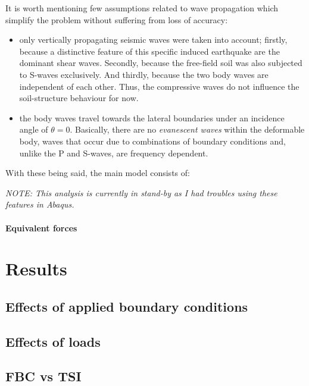 	It is worth mentioning few assumptions related to wave propagation which simplify the problem without suffering from loss of accuracy:
	\begin{itemize}
		\item only vertically propagating seismic waves were taken into account; firstly, because a distinctive feature of this specific induced earthquake are the dominant shear waves. Secondly, because the free-field soil was also subjected to S-waves exclusively. And thirdly, because the two body waves are independent of each other. Thus, the compressive waves do not influence the soil-structure behaviour for now.
		\item the body waves travel towards the lateral boundaries under an incidence angle of $\theta = 0$. Basically, there are no \textit{evanescent waves} within the deformable body, waves that occur due to combinations of boundary conditions and, unlike the P and S-waves, are frequency dependent.
	\end{itemize}
	
	With these being said, the main model consists of:

\textit{NOTE: This analysis is currently in stand-by as I had troubles using these features in Abaqus.}
	 
	\paragraph{Equivalent forces}
	 

\section{Results}
\subsection{Effects of applied boundary conditions}
\subsection{Effects of loads}
\subsection{FBC vs TSI}

